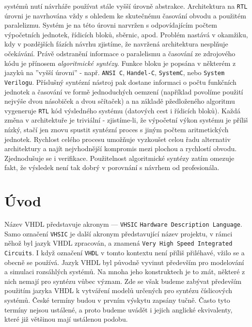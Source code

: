\begin{itemize}
        systémů nutí návrháře používat stále vyšší úrovně abstrakce. Architektura na \texttt{RTL} úrovni je navrhována vždy s
        ohledem ke skutečnému časování obvodu a použitém paralelizmu. Systém je na této úrovni narvržen s odpovídajícím počtem
        výpočetních jednotek, řídicích bloků, sběrnic, apod. Problém nastává v okamžiku, kdy v pozdějších fázích návrhu zjistíme,
        že navržená architektura nesplňuje očekávání. Právě od\-stra\-ně\-ní informace o paralelismu a časování ze zdrojového kódu
        je přínosem \emph{algoritmické syntézy}. Funkce bloku je popsána v některém z jazyků na ''vyšší úrovni'' - např.
        \texttt{ANSI C}, \texttt{Handel-C}, \texttt{SystemC}, nebo \texttt{System Verilogu}. Příslušný syntézní nástroj pak
        dostane informaci o počtu funkčních jednotek a časování ve formě jednoduchých oemzení (například povolíme použití nejvýše
        dvou násobiček a dvou sčítaček) a na základě pžedloženého algoritmu vygeneruje \texttt{RTL} kód výsledného systému
        (datových cest i řídicích bloků). Kaž\-dá změna v architektuře je triviální - zjistíme-li, že výpočetní výkon systému je
        příliš nízký, stačí jen znovu spustit syntézní proces s jiným počtem aritmetických jednotek. Rychlost celého procesu
        umožňuje vyzkoušet celou řadu alternativ architektury a najít nejvhodnější kompromis mezi plochou a rychlostí obvodu.
        Zjednodušuje se i verifikace. Použitelnost algoritmické syntézy zatím omezuje fakt, že výsledek není tak dobrý v
        porovnání s návrhem od profesionála. 
      \end{itemize}
  \section{Úvod}
    Název VHDL představuje akronym — \texttt{VHSIC} \texttt{Hardware Description Language}. Samo označení \texttt{VHSIC} je další
    akronym představující název projektu, v rámci něhož byl jazyk VHDL zpracován, a znamená \texttt{Very High Speed Integrated
    Circuits}. I když označení \texttt{VHDL} v tomto kontextu není příliš přiléhavé, vžilo se a obecně se používá. Jazyk VHDL byl
    původně vyvinut především pro modelování a simulaci rozsáhlých systémů. Na mnoha jeho konstruktech je to znát, některé z nich
    nemají pro syntézu vůbec význam. Zde se však budeme zabývat především použitím jazyka VHDL k vytváření modelů určených pro
    syntézu číslicových systémů. České termíny budou v prvním výskytu zapsány tučně. Často tyto termíny nejsou ustálené, a proto
    budeme uvádět i jejich anglické ekvivalenty, které již většinou mají ustálenou podobu.

